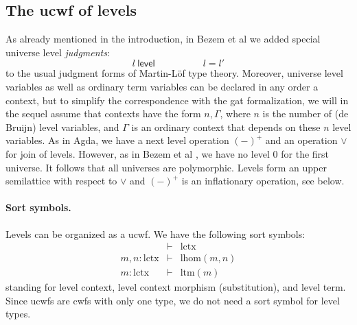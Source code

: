 \documentclass[11pt,a4paper]{article}
\theoremstyle{plain}
\theoremstyle{definition}
\newcommand{\level}{\mathsf{level}}
\def\lHom{\mathrm{lhom}}
\def\lctx{\mathrm{lctx}}
\def\ltm{\mathrm{ltm}}
\begin{document}
\subsection{The ucwf of levels}\label{ucwf-levels}
 As already mentioned in the introduction, in Bezem et al \cite{BezemCDE22} we added special universe level {\em judgments}:
$$
l\ \level
\hspace{5em}
l = l'
$$
to the usual judgment forms of Martin-Löf type theory. Moreover, universe level variables as well as ordinary term variables can be declared in any order a context, but to simplify the correspondence with the gat formalization, we will in the sequel assume that contexts have the form $n, \Gamma$, where $n$ is the number of (de Bruijn) level variables, and $\Gamma$ is an ordinary context that depends on these $n$ level variables.
As in Agda, we have a next level operation $(-)^+$ and an operation $\vee$ for join of levels. However, as in Bezem et al \cite{BezemCDE22}, we have no level 0 for the first universe. It follows that all universes are polymorphic.
Levels form an upper semilattice with respect to $\vee$ and $(-)^+$ is an inflationary operation, see below.

\paragraph{Sort symbols.} Levels can be organized as a ucwf. We have the following sort symbols:
\begin{eqnarray*}
&\vdash& \lctx\\
m, n : \lctx &\vdash& \lHom(m,n)\\
m : \lctx &\vdash& \ltm(m)
\end{eqnarray*}
standing for level context, level context morphism (substitution), and level term.
Since ucwfs are cwfs with only one type, we do not need a sort symbol for level types.
\end{document}
